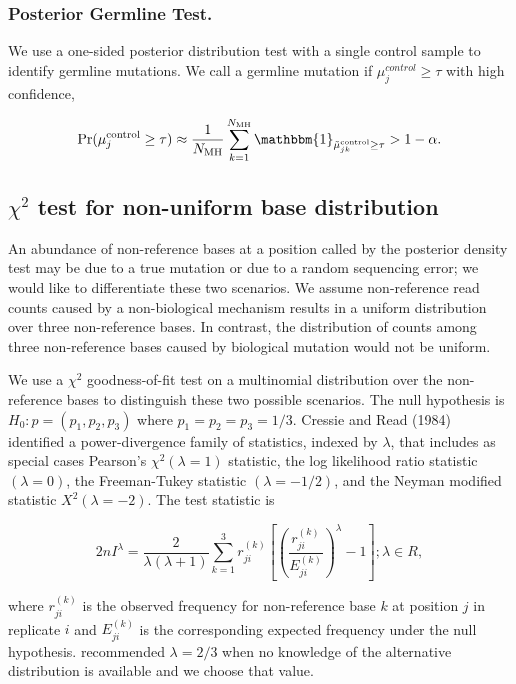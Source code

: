 \documentclass{bioinfo}
\begin{document}
\subsubsection*{Posterior Germline Test.}

We use a one-sided posterior distribution test with a single control sample to identify germline mutations. We call a germline mutation if $ \mu_j^{control} \geq \tau$ with high confidence,

\begin{equation}\label{eqn:germ_test}
	\Pr(\mu_j^{\text{control}}  \geq \tau ) \approx \frac{1}{N_{\text{MH}}} \sum_{k=1}^{N_{\text{MH}}} \mathbbm{1}_{\tilde{\mu}_{jk}^{\text{control}} \geq \tau } > 1-\alpha.
\end{equation}

\subsection{$\chi^2$ test for non-uniform base distribution}

An abundance of non-reference bases at a position called by the posterior density test may be due to a true mutation or due to a random sequencing error; we would like to differentiate these two scenarios. We assume non-reference read counts caused by a non-biological mechanism results in a uniform distribution over three non-reference bases. In contrast, the distribution of counts among three non-reference bases caused by biological mutation would not be uniform.

We use a $\chi^2$ goodness-of-fit test on a multinomial distribution over the non-reference bases to distinguish these two possible scenarios. The null hypothesis is $H_0: p = (p_1, p_2, p_3)$ where $p_1=p_2=p_3=1/3$. Cressie and Read (1984) identified a power-divergence family of statistics, indexed by $\lambda$, that includes as special cases Pearson's $\chi^2 (\lambda = 1)$ statistic, the log likelihood ratio statistic $(\lambda = 0)$, the Freeman-Tukey statistic $(\lambda = -1/2)$, and the Neyman modified statistic $X^2 (\lambda = -2)$. The test statistic is

\begin{equation}
 2nI^\lambda = \frac{2}{\lambda(\lambda+1)}\sum_{k=1}^3 r_{ji}^{(k)} \left[\left(\frac{r_{ji}^{(k)}}{E_{ji}^{(k)}}\right)^\lambda-1\right];\lambda \in R,
\end{equation}

where $r_{ji}^{(k)}$ is the observed frequency for non-reference base $k$ at position $j$ in replicate $i$ and $E_{ji}^{(k)}$ is the corresponding expected frequency under the null hypothesis. \citet{cressie1984multinomial} recommended $\lambda = 2/3$ when no knowledge of the alternative distribution is available and we choose that value.
\end{document}
